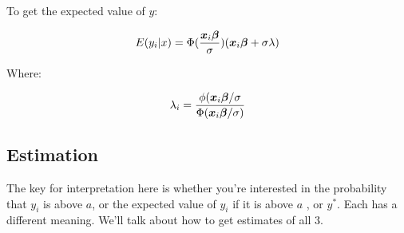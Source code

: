 \documentclass[12 pt]{article}
\begin{document}
To get the expected value of $y$:

\begin{equation}
  \label{eq:7}
  E(y_i|x)=\Phi(\frac{\boldsymbol{x}_i\boldsymbol{\beta}}{\sigma})(\boldsymbol{x}_i\boldsymbol{\beta} +\sigma \lambda)
\end{equation}

Where:

\begin{equation}
  \label{eq:8}
 \lambda_i=\frac{\phi(\boldsymbol{x}_i\boldsymbol{\beta}/\sigma}{ \Phi(\boldsymbol{x}_i\boldsymbol{\beta}/\sigma)} 
\end{equation}

\subsection{Estimation}

The key for interpretation here is whether you're interested in the probability that $y_i$ is above $a$, or the expected value of $y_i$ if it is above $a$ , or $y^*$. Each has a different meaning. We'll talk about how to get estimates of all 3. 
\end{document}
